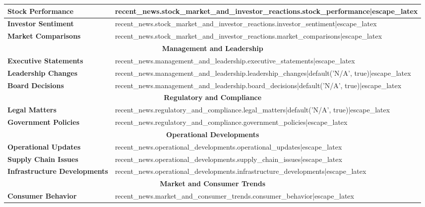 \documentclass{article}
\begin{document}
\begin{table}[H]
\begin{tabularx}{\textwidth}{|m{5cm}|>{\raggedright\arraybackslash}X|}
        \hline
        \textbf{Stock Performance} & {{ recent_news.stock_market_and_investor_reactions.stock_performance|escape_latex }} \\
        \hline
        \textbf{Investor Sentiment} & {{ recent_news.stock_market_and_investor_reactions.investor_sentiment|escape_latex }} \\
        \hline
        \textbf{Market Comparisons} & {{ recent_news.stock_market_and_investor_reactions.market_comparisons|escape_latex }} \\
        \hline
        \multicolumn{2}{|c|}{\textbf{Management and Leadership}} \\
        \hline
        \textbf{Executive Statements} & {{ recent_news.management_and_leadership.executive_statements|escape_latex }} \\
        \hline
        \textbf{Leadership Changes} & {{ recent_news.management_and_leadership.leadership_changes|default('N/A', true)|escape_latex }} \\
        \hline
        \textbf{Board Decisions} & {{ recent_news.management_and_leadership.board_decisions|default('N/A', true)|escape_latex }} \\
        \hline
        \multicolumn{2}{|c|}{\textbf{Regulatory and Compliance}} \\
        \hline
        \textbf{Legal Matters} & {{ recent_news.regulatory_and_compliance.legal_matters|default('N/A', true)|escape_latex }} \\
        \hline
        \textbf{Government Policies} & {{ recent_news.regulatory_and_compliance.government_policies|escape_latex }} \\
        \hline
        \multicolumn{2}{|c|}{\textbf{Operational Developments}} \\
        \hline
        \textbf{Operational Updates} & {{ recent_news.operational_developments.operational_updates|escape_latex }} \\
        \hline
        \textbf{Supply Chain Issues} & {{ recent_news.operational_developments.supply_chain_issues|escape_latex }} \\
        \hline
        \textbf{Infrastructure Developments} & {{ recent_news.operational_developments.infrastructure_developments|escape_latex }} \\
        \hline
        \multicolumn{2}{|c|}{\textbf{Market and Consumer Trends}} \\
        \hline
        \textbf{Consumer Behavior} & {{ recent_news.market_and_consumer_trends.consumer_behavior|escape_latex }} \\

\end{tabularx}
\end{table}
\end{document}
